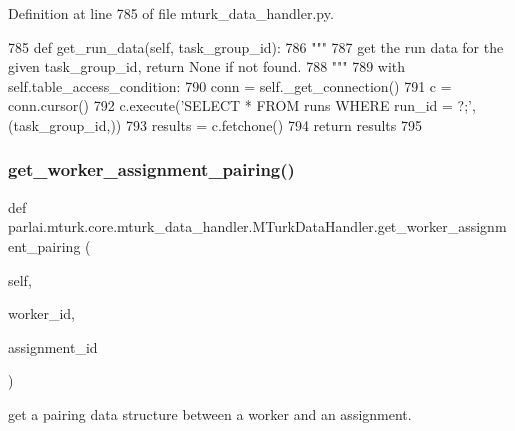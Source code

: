 Definition at line 785 of file mturk\+\_\+data\+\_\+handler.\+py.


\begin{DoxyCode}
785     \textcolor{keyword}{def }get\_run\_data(self, task\_group\_id):
786         \textcolor{stringliteral}{"""}
787 \textcolor{stringliteral}{        get the run data for the given task\_group\_id, return None if not found.}
788 \textcolor{stringliteral}{        """}
789         with self.table\_access\_condition:
790             conn = self.\_get\_connection()
791             c = conn.cursor()
792             c.execute(\textcolor{stringliteral}{'SELECT * FROM runs WHERE run\_id = ?;'}, (task\_group\_id,))
793             results = c.fetchone()
794             \textcolor{keywordflow}{return} results
795 
\end{DoxyCode}
\mbox{\label{classparlai_1_1mturk_1_1core_1_1mturk__data__handler_1_1MTurkDataHandler_a91ba12c1bce3f3af8b760eaf1384a8b9}} 
\subsubsection{\texorpdfstring{get\+\_\+worker\+\_\+assignment\+\_\+pairing()}{get\_worker\_assignment\_pairing()}}
{\footnotesize\ttfamily def parlai.\+mturk.\+core.\+mturk\+\_\+data\+\_\+handler.\+M\+Turk\+Data\+Handler.\+get\+\_\+worker\+\_\+assignment\+\_\+pairing (\begin{DoxyParamCaption}\item[{}]{self,  }\item[{}]{worker\+\_\+id,  }\item[{}]{assignment\+\_\+id }\end{DoxyParamCaption})}

\begin{DoxyVerb}get a pairing data structure between a worker and an assignment.
\end{DoxyVerb}
 

